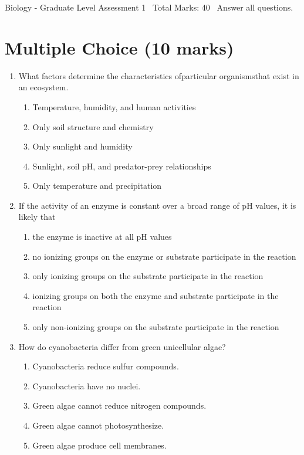 \documentclass[12pt]{article}
\begin{document}
\begin{center}
Biology - Graduate Level Assessment 1 \
Total Marks: 40 \
Answer all questions.
\end{center}

\section*{Multiple Choice (10 marks)}
\begin{enumerate}[label=\arabic*.]
\item What factors determine the characteristics ofparticular organismsthat exist in an ecosystem.
\begin{enumerate}[label=(\alph*)]
    \item Temperature, humidity, and human activities
    \item Only soil structure and chemistry
    \item Only sunlight and humidity
    \item Sunlight, soil pH, and predator-prey relationships
    \item Only temperature and precipitation
\end{enumerate}
\item If the activity of an enzyme is constant over a broad range of pH values, it is likely that
\begin{enumerate}[label=(\alph*)]
    \item the enzyme is inactive at all pH values
    \item no ionizing groups on the enzyme or substrate participate in the reaction
    \item only ionizing groups on the substrate participate in the reaction
    \item ionizing groups on both the enzyme and substrate participate in the reaction
    \item only non-ionizing groups on the substrate participate in the reaction
\end{enumerate}
\item How do cyanobacteria differ from green unicellular algae?
\begin{enumerate}[label=(\alph*)]
    \item Cyanobacteria reduce sulfur compounds.
    \item Cyanobacteria have no nuclei.
    \item Green algae cannot reduce nitrogen compounds.
    \item Green algae cannot photosynthesize.
    \item Green algae produce cell membranes.

\end{enumerate}
\end{enumerate}
\end{document}
